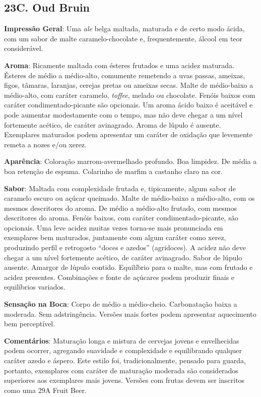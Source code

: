 \subsection*{23C. Oud Bruin}
\textbf{Impressão Geral}: Uma \textit{ale} belga maltada, maturada e de certo modo ácida, com um sabor de malte caramelo-chocolate e, frequentemente, álcool em teor considerável.

\textbf{Aroma}: Ricamente maltada com ésteres frutados e uma acidez maturada. Ésteres de médio a médio-alto, comumente remetendo a uvas passas, ameixas, figos, tâmaras, laranjas, cerejas pretas ou ameixas secas. Malte de médio-baixo a médio-alto, com caráter caramelo, \textit{toffee}, melado ou chocolate. Fenóis baixos com caráter condimentado-picante são opcionais. Um aroma ácido baixo é aceitável e pode aumentar modestamente com o tempo, mas não deve chegar a um nível fortemente acético, de caráter avinagrado. Aroma de lúpulo é ausente. Exemplares maturados podem apresentar um caráter de oxidação que levemente remeta a nozes e/ou xerez.

\textbf{Aparência}: Coloração marrom-avermelhado profundo. Boa limpidez. De média a boa retenção de espuma. Colarinho de marfim a castanho claro na cor.

\textbf{Sabor}: Maltada com complexidade frutada e, tipicamente, algum sabor de caramelo escuro ou açúcar queimado. Malte de médio-baixo a médio-alto, com os mesmos descritores do aroma. De médio a médio-alto frutado, com mesmos descritores do aroma. Fenóis baixos, com caráter condimentado-picante, são opcionais. Uma leve acidez muitas vezes torna-se mais pronunciada em exemplares bem maturados, juntamente com algum caráter como xerez, produzindo perfil e retrogosto “doces e azedos” (agridoces). A acidez não deve chegar a um nível fortemente acético, de caráter avinagrado. Sabor de lúpulo ausente. Amargor de lúpulo contido. Equilíbrio para o malte, mas com frutado e acidez presentes. Combinações e fonte de açúcares podem produzir finais e equilíbrios variados.

\textbf{Sensação na Boca}: Corpo de médio a médio-cheio. Carbonatação baixa a moderada. Sem adstringência. Versões mais fortes podem apresentar aquecimento bem perceptível.

\textbf{Comentários}: Maturação longa e mistura de cervejas jovens e envelhecidas podem ocorrer, agregando suavidade e complexidade e equilibrando qualquer caráter azedo e áspero. Este estilo foi, tradicionalmente, pensado para guarda, portanto, exemplares com caráter de maturação moderada são considerados superiores aos exemplares mais jovens. Versões com frutas devem ser inscritos como uma 29A Fruit Beer.

